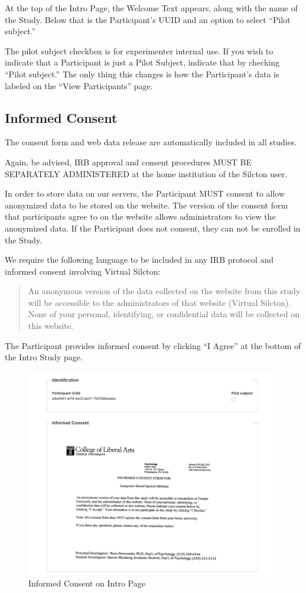 \documentclass[
  12pt,
]{book}
\begin{document}
At the top of the Intro Page, the Welcome Text appears, along with the name of the Study. Below that is the Participant's UUID and an option to select ``Pilot subject.''

The pilot subject checkbox is for experimenter internal use. If you wish to indicate that a Participant is just a Pilot Subject, indicate that by checking ``Pilot subject.'' The only thing this changes is how the Participant's data is labeled on the ``View Participants'' page.

\hypertarget{consent}{%
\subsection{Informed Consent}\label{consent}}

The consent form and web data release are automatically included in all studies.

Again, be advised, IRB approval and consent procedures MUST BE SEPARATELY ADMINISTERED at the home institution of the Silcton user.

In order to store data on our servers, the Participant MUST consent to allow anonymized data to be stored on the website. The version of the consent form that participants agree to on the website allows administrators to view the anonymized data. If the Participant does not consent, they can not be enrolled in the Study.

We require the following language to be included in any IRB protocol and informed consent involving Virtual Silcton:

\begin{quote}
An anonymous version of the data collected on the website from this study will be accessible to the
administrators of that website (Virtual Silcton). None of your personal, identifying, or confidential
data will be collected on this website.
\end{quote}

The Participant provides informed consent by clicking ``I Agree'' at the bottom of the Intro Study page.

\begin{figure}
\centering
\includegraphics{./figs/Intro_Page_1.png}
\caption{Informed Consent on Intro Page}
\end{figure}
\end{document}
